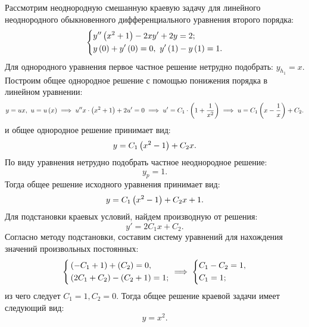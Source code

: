 		Рассмотрим неоднородную смешанную краевую задачу для линейного неоднородного обыкновенного дифференциального уравнения второго порядка:
		\[ \left\lbrace \begin{aligned} 
			&y'' \left( x^2 + 1 \right) - 2xy' + 2y = 2; \\
			&y \left( 0 \right) + y' \left( 0 \right) = 0, ~ y' \left( 1 \right) - y \left( 1 \right) = 1.
		 \end{aligned} \right. \]
		Для однородного уравнения первое частное решение нетрудно подобрать: $y_{h_1} = x$. Построим общее однородное решение с помощью понижения порядка в линейном уравнении:
		\[ y = ux, ~ u = u \left( x \right) \implies u'' x \cdot \left( x^2 + 1 \right) + 2u' = 0 \implies u' = C_1 \cdot \left( 1 + \frac{1}{x^2} \right) \implies u = C_1 \left( x - \frac{1}{x} \right) + C_2. \]
		и общее однородное решение принимает вид:
		\[ y = C_1 \left( x^2 - 1 \right) + C_2 x. \]
		По виду уравнения нетрудно подобрать частное неоднородное решение:
		\[ y_{p} = 1. \]
		Тогда общее решение исходного уравнения принимает вид:
		\[ y = C_1 \left( x^2 - 1 \right) + C_2 x + 1. \]
		Для подстановки краевых условий, найдем производную от решения:
		\[ y' = 2 C_1 x + C_2. \]
		Согласно методу подстановки, составим систему уравнений для нахождения значений произвольных постоянных:
		\[ \left\lbrace \begin{aligned} 
			& \left( - C_1 + 1 \right) + \left( C_2 \right) = 0, \\
			& \left( 2C_1 + C_2 \right) - \left( C_2 + 1 \right) = 1;  
		 \end{aligned} \right. \implies \left\lbrace \begin{aligned} 
			& C_1 - C_2 = 1, \\ &C_1 = 1;
		 \end{aligned} \right. \]
		из чего следует $C_1 = 1, C_2 = 0$. Тогда общее решение краевой задачи имеет следующий вид:
		\[ y = x^2. \]

